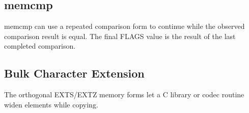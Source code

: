 

\subsection{memcmp}
memcmp can use a repeated comparison form to continue while the observed comparison result is equal. The final FLAGS
value is the result of the last completed comparison.



\subsection{Bulk Character Extension}
The orthogonal EXTS/EXTZ memory forms let a C library or codec routine widen elements while copying.


